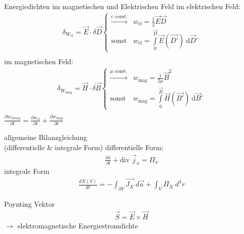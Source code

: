 \documentclass[a6paper]{kartei}
\renewcommand{\div}{\mathrm{div}\;}
\newcommand{\dd}{\ensuremath{\text{d}}}
\begin{document}
	\begin{karte}{Energiedichten im magnetischen und Elektrischen Feld}
	im elektrischen Feld: 
		\begin{eqnarray*}
			\delta_{\text{W}_{\text{el}}} = \vec E  \cdot \delta\vec D \begin{cases}\overset{\epsilon \text{ const.}}{\longrightarrow} & w_{\text{el}} = \frac 1 2 \vec E \vec D \\\text{sonst} & w_{\text{el}} = \int\limits_{0}^{\vec{D}}\vec E (\vec{D'}) \ \dd \vec D' \end{cases}\\
		\end{eqnarray*}
		im magnetischen Feld:
			\begin{eqnarray*}
			\delta_{\text{W}_{\text{mag}}} = \vec H  \cdot \delta\vec B \begin{cases}\overset{\mu \text{ const.}}{\longrightarrow} & w_{\text{mag}} = \frac 1 {2\mu}  \vec B^2 \\\text{sonst} & w_{\text{mag}} = \int\limits_{0}^{\vec{B}}\vec H (\vec{B'}) \ \dd \vec B' \end{cases}\\
		\end{eqnarray*}
		$\frac{\partial w_{elmag}}{\partial t}=\frac{\partial w_{el}}{\partial t}+\frac{\partial w_{mag}}{\partial t}$

	\end{karte}
	
	\begin{karte}{allgemeine Bilanzgleichung\\ (differentielle \& integrale Form)}
		differentielle Form: 
		\begin{eqnarray*}
			\frac{\partial x}{\partial t} + \div \vec j_x = \Pi_x
		\end{eqnarray*}
		integrale Form
		 \begin{eqnarray*}
  \frac{dX(V)}{dt} = - \int_{\partial V} \vec{J_{X}} \ d\vec{a} + \int_{V} \Pi_{X} \ d^{3}r 
 \end{eqnarray*}
	\end{karte}
	
	\begin{karte}{Poynting Vektor}
		\begin{eqnarray*}
			\vec S = \vec E \times \vec H
		\end{eqnarray*}
		$\rightarrow$ elektromagnetische Energiestromdichte
	\end{karte}
\end{document}
